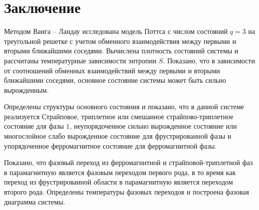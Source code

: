 \section{Заключение}

Методом Ванга -- Ландау исследована модель Поттса с числом состояний $q=3$ на треугольной решетке с учетом обменного взаимодействия между первыми и вторыми ближайшими соседями. Вычислена плотность состояний системы и рассчитаны температурные зависимости энтропии $S$. Показано, что в зависимости от соотношений обменных взаимодействий между первыми и вторыми ближайшими соседями, основное состояние системы может быть сильно вырожденным.

Определены структуры основного состояния и показано, что в данной системе реализуется Страйповое, триплетное или смешанное страйпово-триплетное состояние для фазы $1$, неупорядоченное сильно вырожденное состояние или многослойное слабо вырожденное состояние для фрустрированной фазы и упорядоченное ферромагнитное состояние для ферромагнитной фазы.

Показано, что фазовый переход из ферромагнитной и страйповой-триплетной фаз в парамагнитную является фазовым переходом первого рода, в то время как переход из фрустрированной области в парамагнитную является переходом второго рода. Определены температуры фазовых переходов и построена фазовая диаграмма системы.





